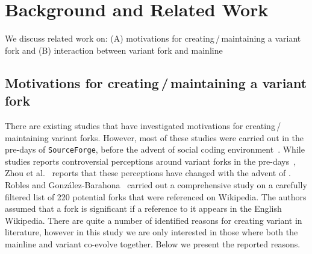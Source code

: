 \section{Background and Related Work}
\label{sec:background}
We discuss related work on: (A) motivations for creating\,/\,maintaining a variant fork and (B) interaction between variant fork and mainline%

\subsection{Motivations for creating\,/\,maintaining a variant fork}
\label{sec:motivations}
There are existing studies that have investigated motivations for creating\,/\,maintaining variant forks. However, most of these studies were carried out in the pre-\gh days of \texttt{SourceForge}, before the advent of social coding environment~\cite{Linus:2012Perspectives,Gregorio:2012,Viseur:2012Forks,Linus:2013CodeForking,Laurent:2008,Linus:2011ToFork}. While studies reports controversial perceptions around variant forks in the pre-\gh days~\cite{Chua:Forking:2017,Dixion:2009Forks,Ernst:2010,Linus:2011ToFork,Linus:2014Hackers,Raymond:Cathedral:2001}, Zhou et al.~\cite{Zhou:2020} reports that these perceptions have changed with the advent of \gh. 
Robles and Gonz{\'a}lez-Barahona~\cite{Gregorio:2012} carried out a comprehensive study on a carefully filtered list of 220 potential forks that were referenced on Wikipedia. The authors assumed that a fork is significant if a reference to it appears in the English Wikipedia.
There are quite a number of identified reasons for creating variant in literature, however in this study we are only interested in those where both the mainline and variant co-evolve together. Below we present the reported reasons. 

